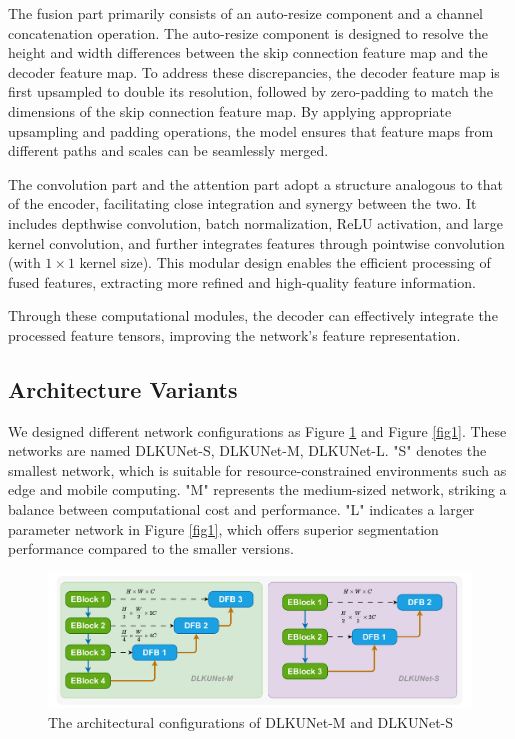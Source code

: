 \documentclass[sn-mathphys-num]{sn-jnl}
\theoremstyle{thmstyleone}%
\theoremstyle{thmstyletwo}%
\theoremstyle{thmstylethree}%
\begin{document}
The fusion part primarily consists of an auto-resize component and a channel concatenation operation.
The auto-resize component is designed to resolve the height and width differences between the skip connection feature map and the decoder feature map.
To address these discrepancies, the decoder feature map is first upsampled to double its resolution, followed by zero-padding to match the dimensions of the skip connection feature map.
By applying appropriate upsampling and padding operations, the model ensures that feature maps from different paths and scales can be seamlessly merged.

The convolution part and the attention part adopt a structure analogous to that of the encoder, facilitating close integration and synergy between the two.
It includes depthwise convolution, batch normalization, ReLU activation, and large kernel convolution, and further integrates features through pointwise convolution (with \(1\times 1\) kernel size).
This modular design enables the efficient processing of fused features, extracting more refined and high-quality feature information.

Through these computational modules, the decoder can effectively integrate the processed feature tensors, improving the network's feature representation.

\subsection{Architecture Variants}\label{subsec4}

We designed different network configurations as Figure \ref{fig4} and Figure \ref{fig1}.
These networks are named DLKUNet-S, DLKUNet-M, DLKUNet-L.
"S" denotes the smallest network, which is suitable for resource-constrained environments such as edge and mobile computing.
"M" represents the medium-sized network, striking a balance between computational cost and performance.
"L" indicates a larger parameter network in Figure \ref{fig1}, which offers superior segmentation performance compared to the smaller versions.

\begin{figure}[h]
    \centering
    \includegraphics[width=\textwidth]{figure4.pdf}
    \caption{The architectural configurations of DLKUNet-M and DLKUNet-S}\label{fig4}
\end{figure}
\end{document}
